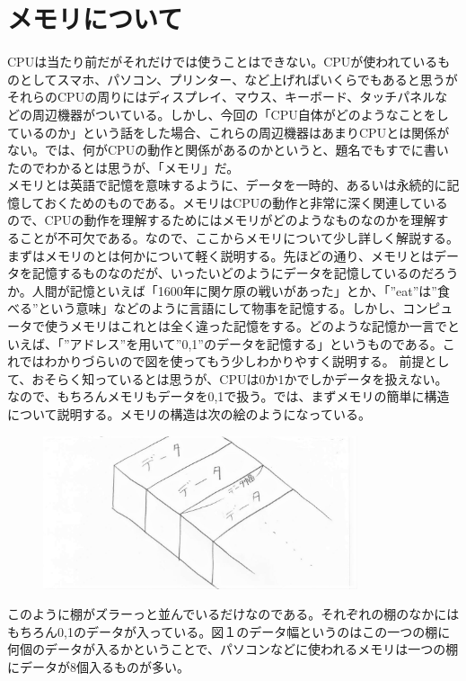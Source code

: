 \section{メモリについて}
CPUは当たり前だがそれだけでは使うことはできない。CPUが使われているものとしてスマホ、パソコン、プリンター、など上げればいくらでもあると思うがそれらのCPUの周りにはディスプレイ、マウス、キーボード、タッチパネルなどの周辺機器がついている。しかし、今回の「CPU自体がどのようなことをしているのか」という話をした場合、これらの周辺機器はあまりCPUとは関係がない。では、何がCPUの動作と関係があるのかというと、題名でもすでに書いたのでわかるとは思うが、「メモリ」だ。\\
メモリとは英語で記憶を意味するように、データを一時的、あるいは永続的に記憶しておくためのものである。メモリはCPUの動作と非常に深く関連しているので、CPUの動作を理解するためにはメモリがどのようなものなのかを理解することが不可欠である。なので、ここからメモリについて少し詳しく解説する。\\
まずはメモリのとは何かについて軽く説明する。先ほどの通り、メモリとはデータを記憶するものなのだが、いったいどのようにデータを記憶しているのだろうか。人間が記憶といえば「1600年に関ケ原の戦いがあった」とか、「”eat”は”食べる”という意味」などのように言語にして物事を記憶する。しかし、コンピュータで使うメモリはこれとは全く違った記憶をする。どのような記憶か一言でといえば、「”アドレス”を用いて”0,1”のデータを記憶する」というものである。これではわかりづらいので図を使ってもう少しわかりやすく説明する。
前提として、おそらく知っているとは思うが、CPUは0か1かでしかデータを扱えない。なので、もちろんメモリもデータを0,1で扱う。では、まずメモリの簡単に構造について説明する。メモリの構造は次の絵のようになっている。\\
\begin{figure}[H]
  \centering
  \includegraphics[height=4.5cm]{honda/image/1.jpeg}
\end{figure}
このように棚がズラーっと並んでいるだけなのである。それぞれの棚のなかにはもちろん0,1のデータが入っている。図１のデータ幅というのはこの一つの棚に何個のデータが入るかということで、パソコンなどに使われるメモリは一つの棚にデータが8個入るものが多い。\\
